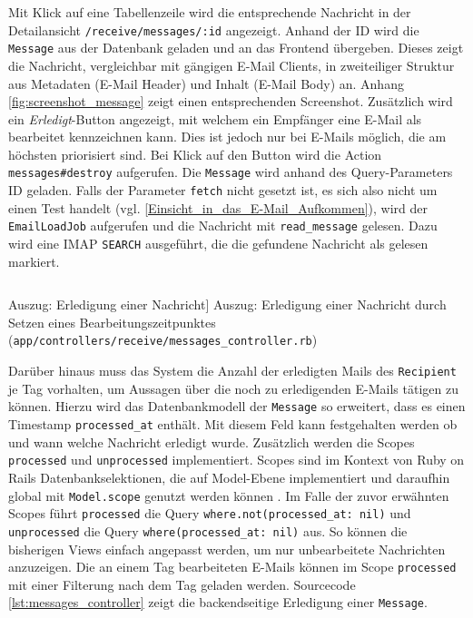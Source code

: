 \noindent Mit Klick auf eine Tabellenzeile wird die entsprechende Nachricht in der Detailansicht \texttt{/receive/messages/:id} angezeigt. Anhand der ID wird die \texttt{Message} aus der Datenbank geladen und an das Frontend übergeben. Dieses zeigt die Nachricht, vergleichbar mit gängigen E-Mail Clients, in zweiteiliger Struktur aus Metadaten (E-Mail Header) und Inhalt (E-Mail Body) an. Anhang \ref{fig:screenshot_message} zeigt einen entsprechenden Screenshot. Zusätzlich wird ein \textit{Erledigt}-Button angezeigt, mit welchem ein Empfänger eine E-Mail als bearbeitet kennzeichnen kann. Dies ist jedoch nur bei E-Mails möglich, die am höchsten priorisiert sind. Bei Klick auf den Button wird die Action \texttt{messages\#destroy} aufgerufen. Die \texttt{Message} wird anhand des Query-Parameters ID geladen. Falls der Parameter \texttt{fetch} nicht gesetzt ist, es sich also nicht um einen Test handelt (vgl. \ref{Einsicht_in_das_E-Mail_Aufkommen}), wird der \texttt{EmailLoadJob} aufgerufen und die Nachricht mit \texttt{read\_message} gelesen. Dazu wird eine IMAP \texttt{SEARCH} ausgeführt, die die gefundene Nachricht als gelesen markiert. 

\begin{listing}[!ht]
\inputminted[firstline=8, lastline=17, linenos]{ruby}{Listings/Pkg3/messages_controller.rb}

\caption
    [Auszug: Erledigung einer Nachricht]
    {Auszug: Erledigung einer Nachricht durch Setzen eines Bearbeitungszeitpunktes (\texttt{app/controllers/receive/messages\_controller.rb})}

\label{lst:messages_controller}
\end{listing}

\noindent Darüber hinaus muss das System die Anzahl der erledigten Mails des \texttt{Recipient} je Tag vorhalten, um Aussagen über die noch zu erledigenden E-Mails tätigen zu können. Hierzu wird das Datenbankmodell der \texttt{Message} so erweitert, dass es einen Timestamp \texttt{processed\_at} enthält. Mit diesem Feld kann festgehalten werden ob und wann welche Nachricht erledigt wurde. Zusätzlich werden die Scopes \texttt{processed} und \texttt{unprocessed} implementiert. Scopes sind im Kontext von Ruby on Rails Datenbankselektionen, die auf Model-Ebene implementiert und daraufhin global mit \texttt{Model.scope} genutzt werden können \citep{Hansson2022c}. Im Falle der zuvor erwähnten Scopes führt \texttt{processed} die Query \texttt{where.not(processed\_at: nil)} und \texttt{unprocessed} die Query \texttt{where(processed\_at: nil)} aus. So können die bisherigen Views einfach angepasst werden, um nur unbearbeitete Nachrichten anzuzeigen. Die an einem Tag bearbeiteten E-Mails können im Scope \texttt{processed} mit einer Filterung nach dem Tag geladen werden. Sourcecode \ref{lst:messages_controller} zeigt die backendseitige Erledigung einer \texttt{Message}.

